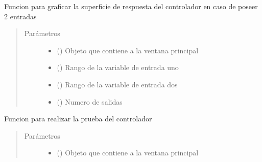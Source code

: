 \documentclass[letterpaper,10pt,spanish]{sphinxmanual}
\begin{document}
\begin{fulllineitems}

\begin{fulllineitems}
\label{\detokenize{codigos/rutinas_fuzzy:rutinas_fuzzy.FuzzyController.graficar_respuesta_3d}}
Funcion para graficar la superficie de respuesta del controlador en caso de poseer 2 entradas
\begin{quote}\begin{description}
\item[{Parámetros}] \leavevmode\begin{itemize}
\item {} 
 () \textendash{} Objeto que contiene a la ventana principal

\item {} 
 () \textendash{} Rango de la variable de entrada uno

\item {} 
 () \textendash{} Rango de la variable de entrada dos

\item {} 
 () \textendash{} Numero de salidas

\end{itemize}

\end{description}\end{quote}

\end{fulllineitems}


\begin{fulllineitems}
\label{\detokenize{codigos/rutinas_fuzzy:rutinas_fuzzy.FuzzyController.prueba_de_controlador}}
Funcion para realizar la prueba del controlador
\begin{quote}\begin{description}
\item[{Parámetros}] \leavevmode\begin{itemize}
\item {} 
 () \textendash{} Objeto que contiene a la ventana principal


\end{itemize}
\end{description}
\end{quote}
\end{fulllineitems}
\end{fulllineitems}
\end{document}
